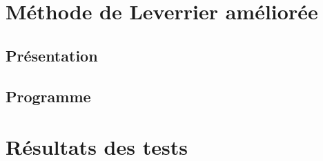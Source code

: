 \documentclass{report}
\begin{document}
    \section{Méthode de Leverrier améliorée}
      \subsection{Présentation}
      \subsection{Programme}
	
	\newpage
    \section{Résultats des tests}
    \renewcommand{\arraystretch}{1.8}
\end{document}
